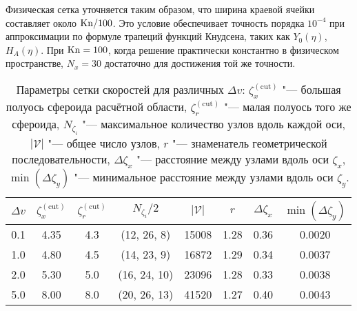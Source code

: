 Физическая сетка уточняется таким образом, что ширина краевой ячейки составляет около \(\mathrm{Kn}/100\).
Это условие обеспечивает точность порядка \(10^{-4}\) при аппроксимации по формуле трапеций функций Кнудсена,
таких как \(Y_0(\eta)\), \(H_A(\eta)\).
При \(\mathrm{Kn}=100\), когда решение практически константно в физическом пространстве,
\(N_x = 30\) достаточно для достижения той же точности.

\begin{table}
    \caption{Параметры сетки скоростей для различных \(\Delta{v}\):
        \(\zeta^{(\mathrm{cut})}_x\) "--- большая полуось сфероида расчётной области,
        \(\zeta^{(\mathrm{cut})}_r\) "--- малая полуось того же сфероида,
        \(N_{\zeta_i}\) "--- максимальное количество узлов вдоль каждой оси,
        \(|\mathcal{V}|\) "--- общее число узлов,
        \(r\) "--- знаменатель геометрической последовательности,
        \(\Delta\zeta_x\) "--- расстояние между узлами вдоль оси \(\zeta_x\),
        \(\min(\Delta\zeta_y)\) "--- минимальное расстояние между узлами вдоль оси \(\zeta_y\).}
    \label{table:velocity_grid}
    \centering
    \begin{tabular}{cccccccc}
        \(\Delta{v}\) & \(\zeta^{(\mathrm{cut})}_x\) & \(\zeta^{(\mathrm{cut})}_r\)
            & \(N_{\zeta_i}/2\) & \(|\mathcal{V}|\) & \(r\) & \(\Delta\zeta_x\) & \(\min(\Delta\zeta_y)\) \\\hline
        0.1 & 4.35 & 4.3 & (12, 26, 8)  & 15008 & 1.28 & 0.36 & 0.0020 \\
        1.0 & 4.80 & 4.5 & (14, 23, 9)  & 16872 & 1.29 & 0.34 & 0.0037 \\
        2.0 & 5.30 & 5.0 & (16, 24, 10) & 23096 & 1.28 & 0.33 & 0.0038 \\
        5.0 & 8.00 & 8.0 & (20, 26, 13) & 41520 & 1.27 & 0.40 & 0.0043 \\
    \end{tabular}
\end{table}

